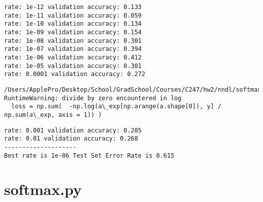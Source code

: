 \documentclass[11pt]{article}
\begin{document}
    \begin{Verbatim}[commandchars=\\\{\}]
rate: 1e-12 validation accuracy: 0.133
rate: 1e-11 validation accuracy: 0.059
rate: 1e-10 validation accuracy: 0.134
rate: 1e-09 validation accuracy: 0.154
rate: 1e-08 validation accuracy: 0.301
rate: 1e-07 validation accuracy: 0.394
rate: 1e-06 validation accuracy: 0.412
rate: 1e-05 validation accuracy: 0.301
rate: 0.0001 validation accuracy: 0.272

    \end{Verbatim}

    \begin{Verbatim}[commandchars=\\\{\}]
/Users/ApplePro/Desktop/School/GradSchool/Courses/C247/hw2/nndl/softmax.py:142: RuntimeWarning: divide by zero encountered in log
  loss = np.sum(  -np.log(a\_exp[np.arange(a.shape[0]), y] / np.sum(a\_exp, axis = 1)) )

    \end{Verbatim}

    \begin{Verbatim}[commandchars=\\\{\}]
rate: 0.001 validation accuracy: 0.285
rate: 0.01 validation accuracy: 0.268
--------------------
Best rate is 1e-06 Test Set Error Rate is 0.615

    \end{Verbatim}

    \hypertarget{softmax.py}{%
\section{softmax.py}\label{softmax.py}}
\end{document}
